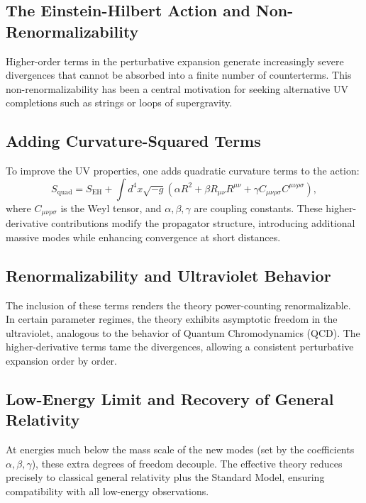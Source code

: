 \documentclass{article}
\begin{document}
\subsection{The Einstein-Hilbert Action and Non-Renormalizability}

Higher-order terms in the perturbative expansion generate increasingly severe divergences that cannot be absorbed into a finite number of counterterms. This non-renormalizability has been a central motivation for seeking alternative UV completions such as strings or loops of supergravity.

\subsection{Adding Curvature-Squared Terms}

To improve the UV properties, one adds quadratic curvature terms to the action:
\[
S_{\text{quad}} = S_{\text{EH}} + \int d^4x \sqrt{-g} \left( \alpha R^2 + \beta R_{\mu\nu} R^{\mu\nu} + \gamma C_{\mu\nu\rho\sigma} C^{\mu\nu\rho\sigma} \right),
\]
where $C_{\mu\nu\rho\sigma}$ is the Weyl tensor, and $\alpha, \beta, \gamma$ are coupling constants. These higher-derivative contributions modify the propagator structure, introducing additional massive modes while enhancing convergence at short distances.

\subsection{Renormalizability and Ultraviolet Behavior}

The inclusion of these terms renders the theory power-counting renormalizable. In certain parameter regimes, the theory exhibits asymptotic freedom in the ultraviolet, analogous to the behavior of Quantum Chromodynamics (QCD). The higher-derivative terms tame the divergences, allowing a consistent perturbative expansion order by order.

\subsection{Low-Energy Limit and Recovery of General Relativity}

At energies much below the mass scale of the new modes (set by the coefficients $\alpha, \beta, \gamma$), these extra degrees of freedom decouple. The effective theory reduces precisely to classical general relativity plus the Standard Model, ensuring compatibility with all low-energy observations.
\end{document}
